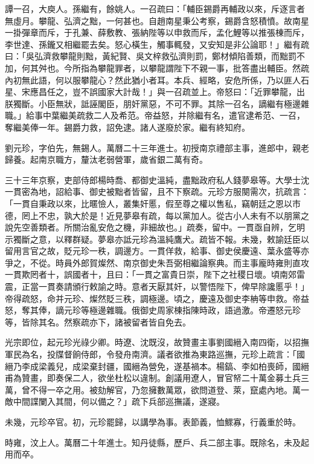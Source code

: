 \begin{pinyinscope}
譚一召，大庾人。孫繼有，餘姚人。一召疏曰：「輔臣錫爵再輔政以來，斥逐言者無虛月。攀龍、弘濟之黜，一何甚也。自趙南星秉公考察，錫爵含怒積憤。故南星一掛彈章而斥，于孔兼、薛敷教、張納陛等以申救而斥，孟化鯉等以推張棟而斥，李世達、孫鑨又相繼罷去矣。怒心橫生，觸事輒發，又安知是非公論耶！」繼有疏曰：「吳弘濟救攀龍則黜，黃紀賢、吳文梓救弘濟則罰，鄭材傾陷善類，而黜罰不加，何其舛也。今所指為攀龍罪者，以攀龍謂陛下不親一事，批答盡出輔臣。然疏內初無此語，何以服攀龍心？然此猶小者耳。本兵、經略，安危所係，乃以匪人石星、宋應昌任之，豈不誤國家大計哉！」與一召疏並上。帝怒曰：「近罪攀龍，出朕獨斷。小臣無狀，詆誣閣臣，朋奸黨惡，不可不罪。其除一召名，謫繼有極邊雜職。」給事中葉繼美疏救二人及希范。帝益怒，并除繼有名，遣官逮希范、一召，奪繼美俸一年。錫爵力救，詔免逮。諸人遂廢於家。繼有終知府。

劉元珍，字伯先，無錫人。萬曆二十三年進士。初授南京禮部主事，進郎中，親老歸養。起南京職方，釐汰老弱營軍，歲省銀二萬有奇。

三十三年京察，吏部侍郎楊時喬、都御史溫純，盡黜政府私人錢夢皋等。大學士沈一貫密為地，詔給事、御史被黜者皆留，且不下察疏。元珍方服闋需次，抗疏言：「一貫自秉政以來，比暱憸人，叢集奸慝，假至尊之權以售私，竊朝廷之恩以市德，罔上不忠，孰大於是！近見夢皋有疏，每以黨加人。從古小人未有不以朋黨之說先空善類者。所關治亂安危之機，非細故也。」疏奏，留中。一貫亟自辨，乞明示獨斷之意，以釋群疑。夢皋亦詆元珍為溫純鷹犬。疏皆不報。未幾，敕諭廷臣以留用言官之故，貶元珍一秩，調邊方。一貫佯救，給事、御史侯慶遠、葉永盛等亦爭之，不從。時員外郎賀燦然、南京御史朱吾弼相繼論察典。而主事龐時雍則直攻一貫欺罔者十，誤國者十，且曰：「一貫之富貴日崇，陛下之社稷日壞。頃南郊雷震，正當一貫奏請頒行敕諭之時。意者天厭其奸，以警悟陛下，俾早除讒慝乎！」帝得疏怒，命并元珍、燦然貶三秩，調極邊。頃之，慶遠及御史李柟等申救。帝益怒，奪其俸，謫元珍等極邊雜職。俄御史周家棟指陳時政，語過激。帝遷怒元珍等，皆除其名。然察疏亦下，諸被留者皆自免去。

光宗即位，起元珍光祿少卿。時遼、沈既沒，故贊畫主事劉國縉入南四衛，以招撫軍民為名，投牒督餉侍郎，令發舟南濟。議者欲推為東路巡撫，元珍上疏言：「國縉乃李成梁義兒，成梁棄封疆，國縉為營免，遂基禍本。楊鎬、李如柏喪師，國縉甫為贊畫，即奏保二人，欲坐杜松以違制。創議用遼人，冒官帑二十萬金募土兵三萬，曾不得一卒之用。被劾解官，乃忽擁數萬眾，欲問道登、萊，竄處內地。萬一敵中間諜闌入其間，何以備之？」疏下兵部巡撫議，遂寢。

未幾，元珍卒官。初，元珍罷歸，以講學為事。表節義，恤鰥寡，行義重於時。

時雍，汶上人。萬曆二十年進士。知丹徒縣，歷戶、兵二部主事。既除名，未及起用而卒。


\end{pinyinscope}
